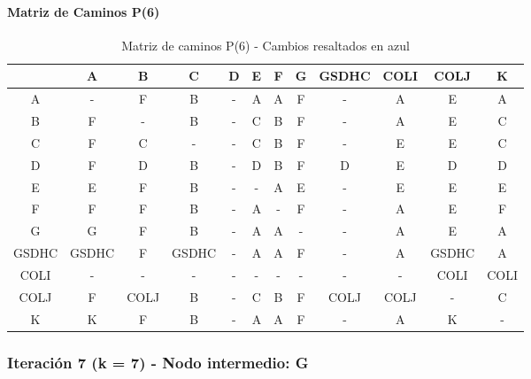 \documentclass[12pt]{article}
\begin{document}
\paragraph{Matriz de Caminos P(6)}
\begin{table}[h!]
\centering
\begin{tabular}{|c|c|c|c|c|c|c|c|c|c|c|c|}
\hline
 & A & B & C & D & E & F & G & GSDHC & COLI & COLJ & K \\\hline
A & - & \cellcolor{lightblue} F & \cellcolor{lightblue} B & - & A & A & \cellcolor{lightblue} F & - & A & E & A \\\hline
B & \cellcolor{lightblue} F & - & B & - & C & B & \cellcolor{lightblue} F & - & \cellcolor{lightblue} A & E & C \\\hline
C & \cellcolor{lightblue} F & C & - & - & C & B & \cellcolor{lightblue} F & - & E & E & C \\\hline
D & \cellcolor{lightblue} F & D & B & - & D & B & \cellcolor{lightblue} F & D & E & D & D \\\hline
E & E & \cellcolor{lightblue} F & \cellcolor{lightblue} B & - & - & A & E & - & E & E & E \\\hline
F & F & F & B & - & A & - & F & - & A & E & F \\\hline
G & G & \cellcolor{lightblue} F & \cellcolor{lightblue} B & - & A & A & - & - & A & E & A \\\hline
GSDHC & GSDHC & \cellcolor{lightblue} F & GSDHC & - & A & A & \cellcolor{lightblue} F & - & A & GSDHC & A \\\hline
COLI & - & - & - & - & - & - & - & - & - & COLI & COLI \\\hline
COLJ & \cellcolor{lightblue} F & COLJ & B & - & C & B & \cellcolor{lightblue} F & COLJ & COLJ & - & C \\\hline
K & K & \cellcolor{lightblue} F & \cellcolor{lightblue} B & - & A & A & \cellcolor{lightblue} F & - & A & K & - \\\hline
\end{tabular}
\caption{Matriz de caminos P(6) - Cambios resaltados en azul}
\end{table}

\subsubsection{Iteración 7 (k = 7) - Nodo intermedio: G}
\end{document}
